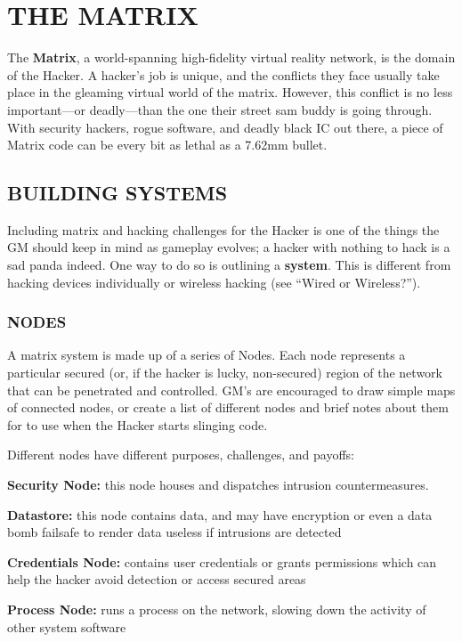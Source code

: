 \documentclass[oneside,10pt]{article}
\begin{document}
\section{THE MATRIX}
\begin{multicols}{2}
The \textbf{Matrix}, a world-spanning high-fidelity virtual reality network, is the domain of the Hacker. A hacker’s job is unique,
and the conflicts they face usually take place in the gleaming
virtual world of the matrix. However, this conflict is no less
important—or deadly—than the one their street sam buddy
is going through. With security hackers, rogue software, and
deadly black IC out there, a piece of Matrix code can be every
bit as lethal as a 7.62mm bullet.

\subsection{BUILDING SYSTEMS}
Including matrix and hacking challenges for the Hacker is
one of the things the GM should keep in mind as gameplay
evolves; a hacker with nothing to hack is a sad panda indeed.
One way to do so is outlining a \textbf{system}. This is different from
hacking devices individually or wireless hacking (see “Wired or Wireless?”).

\subsubsection{NODES}
A matrix system is made up of a series of Nodes. Each node
represents a particular secured (or, if the hacker is lucky,
non-secured) region of the network that can be penetrated
and controlled. GM’s are encouraged to draw simple maps of
connected nodes, or create a list of different nodes and brief
notes about them for to use when the Hacker starts slinging
code.

Different nodes have different purposes, challenges, and payoffs:
\begin{adjustwidth*}{.5cm}{.5cm}
\textbf{Security Node:} this node houses and dispatches intrusion
countermeasures.

\textbf{Datastore:} this node contains data, and may have encryption or even a data bomb failsafe to render data useless if
intrusions are detected

\textbf{Credentials Node:} contains user credentials or grants permissions which can help the hacker avoid detection or access secured areas

\textbf{Process Node:} runs a process on the network, slowing
down the activity of other system software


\end{adjustwidth*}
\end{multicols}
\end{document}
